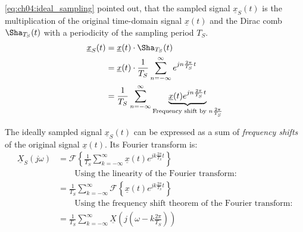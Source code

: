 \begin{refsection}
\eqref{eq:ch04:ideal_sampling} pointed out, that the sampled signal $\underline{x}_S(t)$ is the multiplication of the original time-domain signal $\underline{x}(t)$ and the Dirac comb $\Sha_{T_S}(t)$ with a periodicity of the sampling period $T_S$.
\begin{equation}
	\begin{split}
		\underline{x}_S(t) &= \underline{x}(t) \cdot \Sha_{T_S}(t) \\
		 &= \underline{x}(t) \cdot \frac{1}{T_S} \sum\limits_{n = -\infty}^{\infty} e^{j n \frac{2 \pi}{T_S} t} \\
		 &= \frac{1}{T_S} \sum\limits_{n = -\infty}^{\infty} \underbrace{\underline{x}(t) e^{j n \frac{2 \pi}{T_S} t}}_{\text{Frequency shift by } n \frac{2 \pi}{T_S}} \\
	\end{split}
\end{equation}

The ideally sampled signal $\underline{x}_S(t)$ can be expressed as a sum of \emph{frequency shifts} of the original signal $\underline{x}(t)$. Its Fourier transform is:
\begin{equation}
	\begin{split}
		\underline{X}_S\left(j \omega\right) &= \mathcal{F}\left\{\frac{1}{T_S} \sum\limits_{k = -\infty}^{\infty} \underline{x}(t) e^{j k \frac{2 \pi}{T_S} t}\right\} \\
		 & \qquad \text{Using the linearity of the Fourier transform:} \\
		 &= \frac{1}{T_S} \sum\limits_{k = -\infty}^{\infty} \mathcal{F}\left\{\underline{x}(t) e^{j k \frac{2 \pi}{T_S} t}\right\} \\
		 & \qquad \text{Using the frequency shift theorem of the Fourier transform:} \\
		 &= \frac{1}{T_S} \sum\limits_{k = -\infty}^{\infty} \underline{X}\left(j \left(\omega - k \frac{2 \pi}{T_S} \right)\right)
	\end{split}
\end{equation}


\end{refsection}

